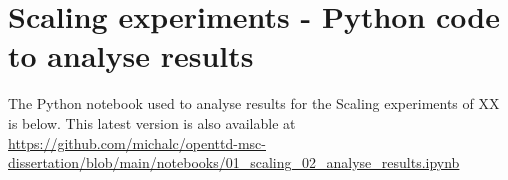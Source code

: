 \documentclass[logo,msc,dsti]{infthesis}    %
\begin{document}


\chapter{Scaling experiments - Python code to analyse results}
\label{chapter:scaling-analyis-code}

The Python notebook used to analyse results for the Scaling experiments of XX is below. This latest version is also available at \url{https://github.com/michalc/openttd-msc-dissertation/blob/main/notebooks/01_scaling_02_analyse_results.ipynb}


\end{document}

